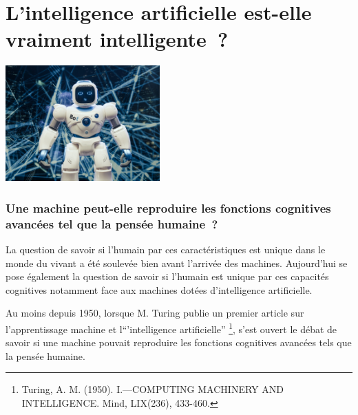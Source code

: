 \documentclass[
  10pt,
  french,
  a5paper,
  openany]{book}
\begin{document}
\hypertarget{lintelligence-artificielle-est-elle-vraiment-intelligente}{%
\chapter{\texorpdfstring{L'intelligence artificielle \linebreak est-elle vraiment intelligente~?}{L'intelligence artificielle est-elle vraiment intelligente~?}}\label{lintelligence-artificielle-est-elle-vraiment-intelligente}}

\begin{center}
\includegraphics[width=\textwidth,height=12em]{images/intelligence-artificelle.jpeg}

\end{center}

\hypertarget{une-machine-peut-elle-reproduire-les-fonctions-cognitives-avancuxe9es-tel-que-la-pensuxe9e-humaine}{%
\subsection*{Une machine peut-elle reproduire les fonctions cognitives avancées tel que la pensée humaine~?}\label{une-machine-peut-elle-reproduire-les-fonctions-cognitives-avancuxe9es-tel-que-la-pensuxe9e-humaine}}

La question de savoir si l'humain par ces caractéristiques est unique dans le monde du vivant a été soulevée bien avant l'arrivée des machines. Aujourd'hui se pose également la question de savoir si l'humain est unique par ces capacités cognitives notamment face aux machines dotées d'intelligence artificielle.

Au moins depuis 1950, lorsque M. Turing publie un premier article sur l'apprentissage machine et l``'intelligence artificielle'' \footnote{Turing, A. M. (1950). I.---COMPUTING MACHINERY AND INTELLIGENCE. Mind, LIX(236), 433-460.}, s'est ouvert le débat de savoir si une machine pouvait reproduire les fonctions cognitives avancées tels que la pensée humaine.
\end{document}
